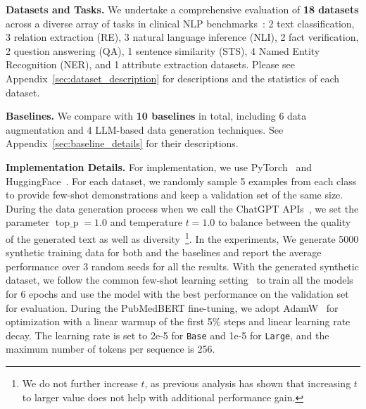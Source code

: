 \noindent \textbf{Datasets and Tasks.}
We undertake a comprehensive evaluation of \textbf{18 datasets} across a diverse array of tasks in clinical NLP benchmarks~\citep{blue,fries2022bigbio}: 2 text classification, 3 relation extraction (RE), 3 natural language inference (NLI), 2 fact verification, 2 question answering (QA), 1 sentence similarity (STS), 4 Named Entity Recognition (NER), and 1 attribute extraction datasets. 
Please see Appendix~\ref{sec:dataset_description} for descriptions and the statistics of each dataset.

\noindent  \textbf{Baselines.}
We compare {\ours} with \textbf{10 baselines} in total, including
6 data augmentation and 4 LLM-based data generation techniques. 
See Appendix~\ref{sec:baseline_details} for their descriptions. 

\noindent \textbf{Implementation Details.}
\label{sec:implementation_details}
For implementation, we use PyTorch~\citep{paszke2019pytorch} and HuggingFace~\citep{wolf2019huggingface}. For each dataset, we randomly sample 5 examples from each class to provide few-shot demonstrations and keep a validation set of the same size. 
During the data generation process when we call the ChatGPT APIs~\citep{chatgpt}, we set the parameter $\operatorname{top\_p}=1.0$ and temperature $t=1.0$ to balance between the quality of the generated text as well as diversity~\citep{chung-etal-2023-increasing,yu2023large}\footnote{We do not further increase $t$, as previous analysis  \citep{chung-etal-2023-increasing,yu2023large} has shown that increasing $t$ to larger value does not help with additional performance gain.}. 
In the experiments, We generate 5000 synthetic training data for both {\ours} and the baselines and report the average performance over 3 random seeds for all the results. 
With the generated synthetic dataset, we follow the common few-shot learning setting~\citep{perez2021true} to train all the models for 6 epochs and use the model with the best performance on the validation set for evaluation. 
During the PubMedBERT fine-tuning, we adopt AdamW~\citep{loshchilov2017decoupled} for optimization with a linear warmup of the first 5\% steps and linear learning rate decay. The learning rate is set to 2e-5 for \texttt{Base} and 1e-5 for \texttt{Large}, and the maximum number of tokens per sequence is 256. 

